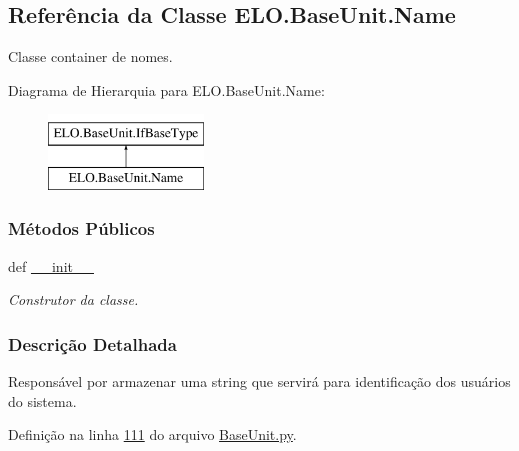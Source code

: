 \hypertarget{classELO_1_1BaseUnit_1_1Name}{\subsection{Referência da Classe E\-L\-O.\-Base\-Unit.\-Name}
\label{classELO_1_1BaseUnit_1_1Name}
}


Classe container de nomes.  


Diagrama de Hierarquia para E\-L\-O.\-Base\-Unit.\-Name\-:\begin{figure}[H]
\begin{center}
\leavevmode
\includegraphics[height=2.000000cm]{d9/dff/classELO_1_1BaseUnit_1_1Name}
\end{center}
\end{figure}
\subsubsection*{Métodos Públicos}
\begin{DoxyCompactItemize}
\item 
def \hyperlink{classELO_1_1BaseUnit_1_1Name_ad73fdab6426635b79b4447ac53c10279}{\-\_\-\-\_\-init\-\_\-\-\_\-}
\begin{DoxyCompactList}\small\item\em Construtor da classe. \end{DoxyCompactList}\end{DoxyCompactItemize}


\subsubsection{Descrição Detalhada}
Responsável por armazenar uma string que servirá para identificação dos usuários do sistema. 

Definição na linha \hyperlink{BaseUnit_8py_source_l00111}{111} do arquivo \hyperlink{BaseUnit_8py_source}{Base\-Unit.\-py}.



